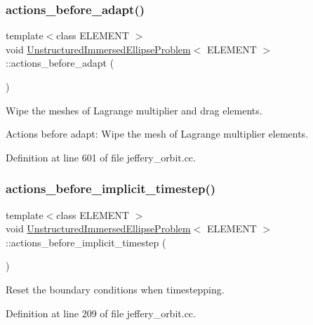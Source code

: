 \subsubsection{\texorpdfstring{actions\+\_\+before\+\_\+adapt()}{actions\_before\_adapt()}}
{\footnotesize\ttfamily template$<$class E\+L\+E\+M\+E\+NT $>$ \\
void \hyperlink{classUnstructuredImmersedEllipseProblem}{Unstructured\+Immersed\+Ellipse\+Problem}$<$ E\+L\+E\+M\+E\+NT $>$\+::actions\+\_\+before\+\_\+adapt (\begin{DoxyParamCaption}{ }\end{DoxyParamCaption})}



Wipe the meshes of Lagrange multiplier and drag elements. 

Actions before adapt\+: Wipe the mesh of Lagrange multiplier elements. 

Definition at line 601 of file jeffery\+\_\+orbit.\+cc.

\mbox{\label{classUnstructuredImmersedEllipseProblem_a368c412c4c9a9e9403b4e67d3582e3a5}} 
\subsubsection{\texorpdfstring{actions\+\_\+before\+\_\+implicit\+\_\+timestep()}{actions\_before\_implicit\_timestep()}}
{\footnotesize\ttfamily template$<$class E\+L\+E\+M\+E\+NT $>$ \\
void \hyperlink{classUnstructuredImmersedEllipseProblem}{Unstructured\+Immersed\+Ellipse\+Problem}$<$ E\+L\+E\+M\+E\+NT $>$\+::actions\+\_\+before\+\_\+implicit\+\_\+timestep (\begin{DoxyParamCaption}{ }\end{DoxyParamCaption})\hspace{0.3cm}{\ttfamily [inline]}}



Reset the boundary conditions when timestepping. 



Definition at line 209 of file jeffery\+\_\+orbit.\+cc.


